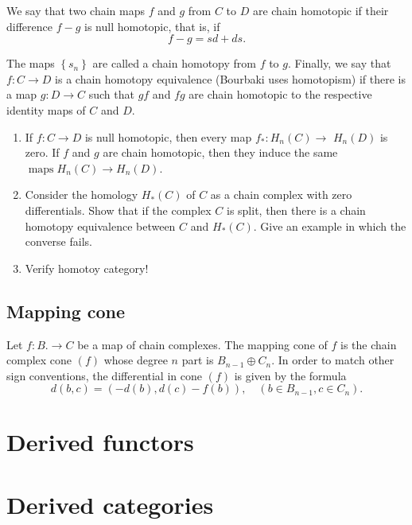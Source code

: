 \begin{example}
We say that two chain maps $f$ and $g$ from $C$ to $D$ are chain homotopic if their difference $f-g$ is null homotopic, that is, if
      $$
      f-g=s d+d s .
      $$
      
      The maps $\left\{s_n\right\}$ are called a chain homotopy from $f$ to $g$. Finally, we say that $f: C \rightarrow D$ is a chain homotopy equivalence (Bourbaki uses homotopism) if there is a map $g: D \rightarrow C$ such that $g f$ and $f g$ are chain homotopic to the respective identity maps of $C$ and $D$.

\begin{prop}
    \begin{enumerate}
        \item If $f: C \rightarrow D$ is null homotopic, then every map $f_*: H_n(C) \rightarrow$ $H_n(D)$ is zero. If $f$ and $g$ are chain homotopic, then they induce the same $\operatorname{maps} H_n(C) \rightarrow H_n(D)$.
        \item Consider the homology $H_*(C)$ of $C$ as a chain complex with zero differentials. Show that if the complex $C$ is split, then there is a chain homotopy equivalence between $C$ and $H_*(C)$. Give an example in which the converse fails.
        \item Verify homotoy category!
    \end{enumerate}
\end{prop}

\subsection*{Mapping cone}
Let $f: B . \rightarrow C$ be a map of chain complexes. The mapping cone of $f$ is the chain complex cone $(f)$ whose degree $n$ part is $B_{n-1} \oplus C_n$. In order to match other sign conventions, the differential in cone $(f)$ is given by the formula
$$
d(b, c)=(-d(b), d(c)-f(b)), \quad\left(b \in B_{n-1}, c \in C_n\right) .
$$



\section{Derived functors}




\section{Derived categories}









\end{example}

